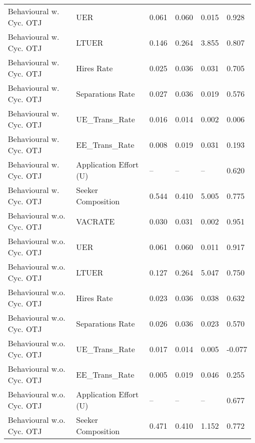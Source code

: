 \begin{table}[ht]
\begin{adjustbox}{width=\textwidth}
\begin{tabular}{llllll}
Behavioural w. Cyc. OTJ & UER & 0.061 & 0.060 & 0.015 & 0.928 \\
Behavioural w. Cyc. OTJ & LTUER & \cellcolor{yellow!25}0.146 & 0.264 & \cellcolor{yellow!25}3.855 & \cellcolor{yellow!25}0.807 \\
Behavioural w. Cyc. OTJ & Hires Rate & 0.025 & 0.036 & 0.031 & \cellcolor{yellow!25}0.705 \\
Behavioural w. Cyc. OTJ & Separations Rate & 0.027 & 0.036 & 0.019 & \cellcolor{yellow!25}0.576 \\
Behavioural w. Cyc. OTJ & UE_Trans_Rate & \cellcolor{yellow!25}0.016 & 0.014 & \cellcolor{yellow!25}0.002 & \cellcolor{yellow!25}0.006 \\
Behavioural w. Cyc. OTJ & EE_Trans_Rate & 0.008 & 0.019 & 0.031 & 0.193 \\
Behavioural w. Cyc. OTJ & Application Effort (U) & -- & -- & -- & 0.620 \\
Behavioural w. Cyc. OTJ & Seeker Composition & 0.544 & 0.410 & 5.005 & 0.775 \\
Behavioural w.o. Cyc. OTJ & VACRATE & 0.030 & 0.031 & 0.002 & 0.951 \\
Behavioural w.o. Cyc. OTJ & UER & 0.061 & 0.060 & \cellcolor{yellow!25}0.011 & 0.917 \\
Behavioural w.o. Cyc. OTJ & LTUER & 0.127 & 0.264 & 5.047 & 0.750 \\
Behavioural w.o. Cyc. OTJ & Hires Rate & 0.023 & 0.036 & 0.038 & 0.632 \\
Behavioural w.o. Cyc. OTJ & Separations Rate & 0.026 & 0.036 & 0.023 & 0.570 \\
Behavioural w.o. Cyc. OTJ & UE_Trans_Rate & 0.017 & 0.014 & 0.005 & -0.077 \\
Behavioural w.o. Cyc. OTJ & EE_Trans_Rate & 0.005 & 0.019 & 0.046 & \cellcolor{yellow!25}0.255 \\
Behavioural w.o. Cyc. OTJ & Application Effort (U) & -- & -- & -- & \cellcolor{yellow!25}0.677 \\
Behavioural w.o. Cyc. OTJ & Seeker Composition & \cellcolor{yellow!25}0.471 & 0.410 & \cellcolor{yellow!25}1.152 & 0.772 \\
\bottomrule
\end{tabular}
\end{adjustbox}
\end{table}
